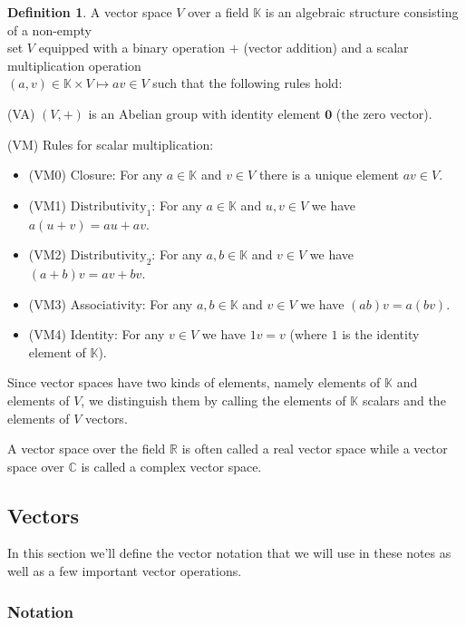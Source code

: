 \documentclass{article}
\theoremstyle{definition}
\newtheorem{definition}{Definition}[section]
\begin{document}
\bigskip
\begin{definition}
A vector space $V$ over a field $\mathbb{K}$ is an algebraic
structure consisting of a non-empty \\ set $V$ equipped with a
binary operation $+$ (vector addition) and a scalar
multiplication operation \\ $(a,v) \in \mathbb{K} \times V
\mapsto av \in V$ such that the following rules hold:


\bigskip
\noindent
(VA) $(V,+)$ is an Abelian group with identity element
$\mathbf{0}$ (the zero vector).  

\bigskip
\noindent
(VM) Rules for scalar multiplication:

\medskip
\begin{itemize}
\item [] (VM0) Closure: For any $a   \in \mathbb{K}$ and $v \in V$ there is a unique element $av \in V$.
\item [] (VM1) $\text{Distributivity}_{1}$: For any $a \in \mathbb{K}$ and $u,v \in V$ we have $a(u+v)=au+av$.
\item [] (VM2) $\text{Distributivity}_{2}$: For any $a,b \in \mathbb{K}$ and $v \in V$ we have $(a+b)v=av+bv$.
\item [] (VM3) Associativity: For any $a,b \in \mathbb{K}$ and $v \in V$ we have $(ab)v=a(bv)$.
\item [] (VM4) Identity: For any $v \in V$ we have $1v = v$ (where $1$ is the identity element of $\mathbb{K}$).
\end{itemize}
\end{definition}

\medskip
\noindent
Since vector spaces have two kinds of elements, namely elements
of $\mathbb{K}$ and elements of $V$, we distinguish them by
calling the elements of $\mathbb{K}$ scalars and the elements of
$V$ vectors.

\bigskip
\noindent
A vector space over the field $\mathbb{R}$ is often called a real
vector space while a vector space over $\mathbb{C}$ is called a
complex vector space.

\subsection{Vectors}
In this section we'll define the vector notation that we will use
in these notes as well as a few important vector operations.

\smallskip
\subsubsection{Notation} 
\end{document}
